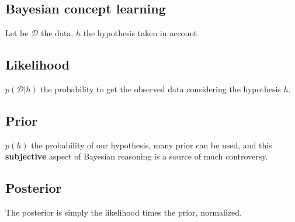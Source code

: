 \subsection{Bayesian concept learning}
Let be $\mathcal{D}$ the data, $h$ the hypothesis taken in account
\subsection{Likelihood}
$p\left(\mathcal{D}|h\right)$ the probability to get the observed data considering the 
hypothesis $h$.
\subsection{Prior}
$p(h)$ the probability of our hypothesis, many prior can be used, and this 
\textbf{subjective} aspect of Bayesian reasoning is a source of much controversy.

\subsection{Posterior}
The posterior is simply the likelihood times the prior, normalized.
\begin{center}
\end{center}
